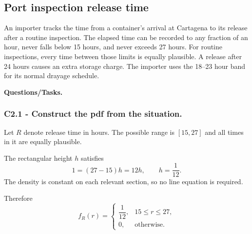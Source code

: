 \subsection{Port inspection release time}\label{sec:c2-uniform-port}
An importer tracks the time from a container's arrival at Cartagena to its
release after a routine inspection.  The elapsed time can be recorded to any
fraction of an hour, never falls below 15 hours, and never exceeds 27 hours.
For routine inspections, every time between those limits is equally plausible.
A release after 24 hours causes an extra storage charge.  The importer uses the
18--23 hour band for its normal drayage schedule.

\begingroup{}
\endgroup

\textbf{Questions/Tasks.}
\begin{enumerate}
\end{enumerate}

\subsubsection*{C2.1 - Construct the pdf from the situation.}
\label{subsec:c2-uniform-port-a}
Let $R$ denote release time in hours.  The possible range is $[15,27]$ and all
times in it are equally plausible.

The rectangular height $h$ satisfies
\[
 1=(27-15)h=12h,\qquad h=\frac1{12}.
\]
The density is constant on each relevant section, so no line equation is required.

Therefore
\[
 f_R(r)=\begin{cases}\dfrac1{12},&15\le r\le27,\\[2mm]0,&\text{otherwise.}\end{cases}
\]

